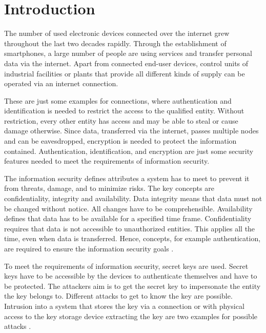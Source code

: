 \chapter{Introduction}
\label{cap:introduction}

The number of used electronic devices connected over the internet grew throughout the last two decades rapidly.
Through the establishment of smartphones, a large number of people are using services and transfer personal data via the internet. %
Apart from connected end-user devices, control units of industrial facilities or plants that provide all different kinds of supply can be operated via an internet connection. %

These are just some examples for connections, where authentication and identification is needed to restrict the access to the qualified entity.
Without restriction, every other entity has access and may be able to steal or cause damage otherwise. %
Since data, transferred via the internet, passes multiple nodes and can be eavesdropped, encryption is needed to protect the information contained.
Authentication, identification, and encryption are just some security features needed to meet the requirements of information security.

The information security defines attributes a system has to meet to prevent it from threats, damage, and to minimize risks.
The key concepts are confidentiality, integrity and availability. %
Data integrity means that data must not be changed without notice.
All changes have to be comprehensible.
Availability defines that data has to be available for a specified time frame. %
Confidentiality requires that data is not accessible to unauthorized entities.
This applies all the time, even when data is transferred.
Hence, concepts, for example authentication, are required to ensure the information security goals \cite{Wikipedia2017InformationSecurity}.

To meet the requirements of information security, secret keys are used.
Secret keys have to be accessible by the devices to authenticate themselves and have to be protected. %
The attackers aim is to get the secret key to impersonate the entity the key belongs to.
Different attacks to get to know the key are possible.
Intrusion into a system that stores the key via a connection or with physical access to the key storage device extracting the key are two examples for possible attacks \cite{Wikipedia2016Attackcomputing,Wikipedia2017Side-channelAttack}.

